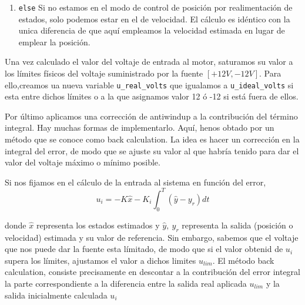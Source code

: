 \begin{enumerate}
\begin{enumerate}
Comparamos el valor consigna con la posición estimada para obtener el error en posición. incrementamos el valor del error integral en posicion añadiendo el error de posición actual multiplicado por el tiempo de muestreo (TS\_DSP = 1ms) \texttt{ motor.x\_integral\_pos += error\_seguimiento * TS\_DSP}.

Calculamos cuanto sería la entrada, multiplicado las ganancias de realimentacion por el vector de estados estimados $u = K\hat(x)$. A este resultado cambiado de signo le restamos la contribución debida al error integral y obtenemos el valor de la entrada que guardamos en la variable \texttt{u\_ideal\_volts}.

Es interesante señalar, que el estimador que estamos empleado, que se ha obtenido identificando el motor, trabaja en voltios. Es decir las constantes están calculadas de modo que la entrada al sistema calculada \texttt{u\_ideal\_volts} se obtiene en voltios.

\item \texttt{else} Si no estamos en el modo de control de posición por realimentación de estados, solo podemos estar en el de velocidad. El cálculo es idéntico con la unica diferencia de que aquí empleamos la velocidad estimada en lugar de emplear la posición.
\end{enumerate}
Una vez calculado el valor del voltaje de entrada al motor, saturamos su valor a los límites físicos del voltaje suministrado por la fuente $[+12V,-12V]$. Para ello,creamos ua nueva variable \texttt{u\_real\_volts} que igualamos a \texttt{u\_ideal\_volts} si esta entre dichos límites o a la que asignamos valor 12 ó -12 si está fuera de ellos.

Por último aplicamos una corrección de antiwindup a la contribución del término integral. Hay muchas formas de implementarlo. Aquí, henos obtado por un método que se conoce como  back calculation. La idea es hacer un corrección en la integral del error, de modo que se ajuste su valor al que habría tenido para dar el valor del voltaje máximo o mínimo posible. 

Si nos fijamos en el cálculo de la entrada al sistema en función del error,
\begin{equation*}
    u_i = -K\hat{x} - K_i\int_0^T (\hat{y} -y_r)dt  
\end{equation*}

donde $\hat{x}$ representa los estados estimados y $\hat{y},\ y_r$ representa la salida (posición o velocidad) estimada y su valor de referencia. Sin embargo, sabemos que el voltaje que nos puede dar la fuente esta límitado, de modo que si el valor obtenid de $u_i$ supera los límites, ajustamos el valor a dichos limites $u_{lim}$. El método back calculation, consiste precisamente en descontar a la contribución del error integral la parte correspondiente a la diferencia entre la salida real aplicada $u_{lim}$ y la salida inicialmente calculada $u_i$ 


\end{enumerate}
